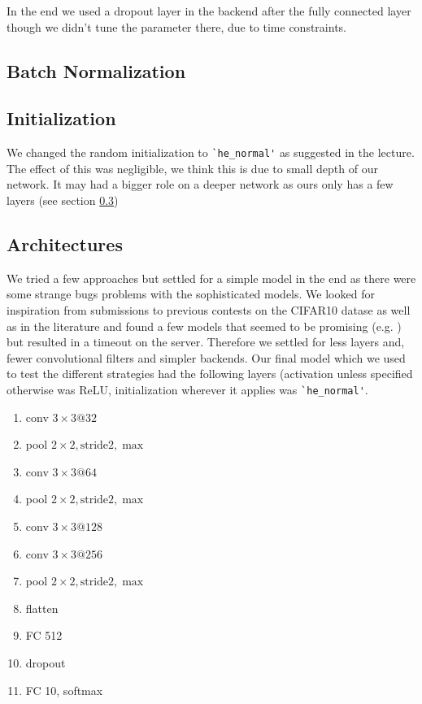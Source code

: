In the end we used a dropout layer in the backend after the fully connected layer though we didn't tune the parameter there, due to time constraints. 
\subsection{Batch Normalization \TODO}

\subsection{Initialization}
We changed the random initialization to \lstinline{`he_normal'} \cite{he} as suggested in the lecture. The effect of this was negligible, we think this is due to small depth of our network. It may had a bigger role on a deeper network as ours only has a few layers (see section \ref{sec:a})
\subsection{Architectures}\label{sec:a}
We tried a few approaches but settled for a simple model in the end as there were some strange bugs problems with the sophisticated models. We looked for inspiration from submissions to previous contests on the CIFAR10 datase as well as in the literature and found a few models that seemed to be promising  (e.g. \cite{ref})  but resulted in a timeout on the server. Therefore we settled for less layers and, fewer convolutional filters and simpler backends. 
Our final model which we used to test the different strategies had the following layers (activation unless specified otherwise was ReLU, initialization wherever it applies was \lstinline{`he_normal'}.
\begin{enumerate}
\item conv $3\times 3@32$
\item pool $2\times 2, \text{stride} 2, \max$
\item conv $3\times 3@64$
\item pool $2\times 2, \text{stride} 2, \max$
\item conv $3\times 3@128$
\item conv $3\times 3@256$
\item pool $2\times 2, \text{stride} 2, \max$
\item flatten
\item FC 512
\item dropout
\item FC 10, softmax
\end{enumerate}

